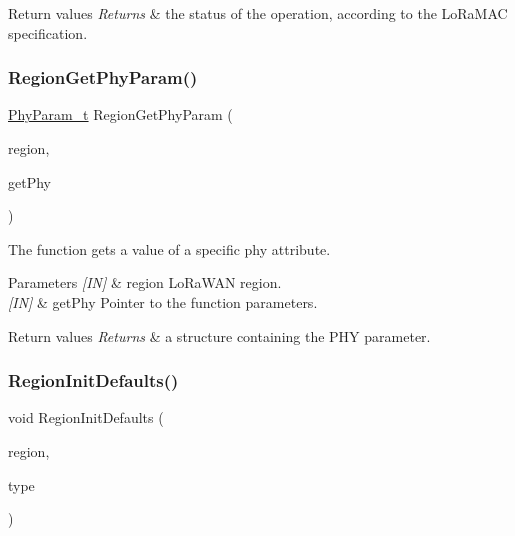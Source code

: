 \begin{DoxyRetVals}{Return values}
{\em Returns} & the status of the operation, according to the Lo\+Ra\+M\+AC specification. \\
\hline
\end{DoxyRetVals}
\mbox{\label{group__REGION_gafbd084611ba512035a6cbe7f3aa5857b}} 
\subsubsection{\texorpdfstring{Region\+Get\+Phy\+Param()}{RegionGetPhyParam()}}
{\footnotesize\ttfamily \hyperlink{group__REGION_gaed159b26e5c4677236b6e8677019db30}{Phy\+Param\+\_\+t} Region\+Get\+Phy\+Param (\begin{DoxyParamCaption}\item[{\hyperlink{group__LORAMAC_ga80c48efda9ae02e14b58160d34a798dd}{Lo\+Ra\+Mac\+Region\+\_\+t}}]{region,  }\item[{\hyperlink{group__REGION_gab471483fff904f4f89bbc03f7fc380ab}{Get\+Phy\+Params\+\_\+t} $\ast$}]{get\+Phy }\end{DoxyParamCaption})}



The function gets a value of a specific phy attribute. 


\begin{DoxyParams}{Parameters}
{\em \mbox{[}\+I\+N\mbox{]}} & region Lo\+Ra\+W\+AN region.\\
\hline
{\em \mbox{[}\+I\+N\mbox{]}} & get\+Phy Pointer to the function parameters.\\
\hline
\end{DoxyParams}

\begin{DoxyRetVals}{Return values}
{\em Returns} & a structure containing the P\+HY parameter. \\
\hline
\end{DoxyRetVals}
\mbox{\label{group__REGION_ga54b1b27a8431cd146b4dc33a894ee6db}} 
\subsubsection{\texorpdfstring{Region\+Init\+Defaults()}{RegionInitDefaults()}}
{\footnotesize\ttfamily void Region\+Init\+Defaults (\begin{DoxyParamCaption}\item[{\hyperlink{group__LORAMAC_ga80c48efda9ae02e14b58160d34a798dd}{Lo\+Ra\+Mac\+Region\+\_\+t}}]{region,  }\item[{\hyperlink{group__REGION_gaddc73ae10673ec925724e7870363bda9}{Init\+Type\+\_\+t}}]{type }\end{DoxyParamCaption})}



